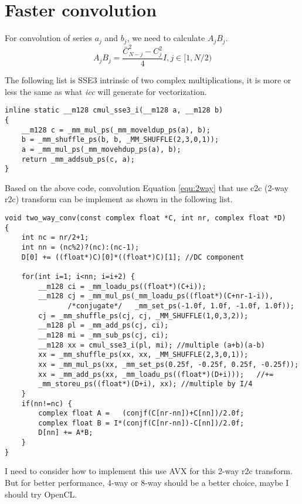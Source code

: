 \documentclass[a4paper,12pt]{article}
\begin{document}
\section{Faster convolution}
For convolution of series $a_j$ and $b_j$, we need to calculate $A_jB_j$.
\begin{equation}
    A_jB_j=\frac{\bar{C}^2_{N-j}-C^2_j}{4}I , j\in[1, N/2) 
        \label{equ:2way}
\end{equation}
\par
The following list is SSE3 intrinsic of two complex multiplications, 
it is more or less the same as what \emph{icc} will generate for vectorization.
\begin{lstlisting}
inline static __m128 cmul_sse3_i(__m128 a, __m128 b)
{
    __m128 c = _mm_mul_ps(_mm_moveldup_ps(a), b);
    b = _mm_shuffle_ps(b, b, _MM_SHUFFLE(2,3,0,1));
    a = _mm_mul_ps(_mm_movehdup_ps(a), b);
    return _mm_addsub_ps(c, a);
}
\end{lstlisting}
Based on the above code, convolution Equation \ref{equ:2way} that use c2c (2-way r2c) transform 
can be implement as shown in the following list.
\begin{lstlisting}
void two_way_conv(const complex float *C, int nr, complex float *D)
{
    int nc = nr/2+1;
    int nn = (nc%2)?(nc):(nc-1);
    D[0] += ((float*)C)[0]*((float*)C)[1]; //DC component

    for(int i=1; i<nn; i=i+2) {
        __m128 ci = _mm_loadu_ps((float*)(C+i));
        __m128 cj = _mm_mul_ps(_mm_loadu_ps((float*)(C+nr-1-i)), 
               /*conjugate*/   _mm_set_ps(-1.0f, 1.0f, -1.0f, 1.0f)); 
        cj = _mm_shuffle_ps(cj, cj, _MM_SHUFFLE(1,0,3,2));
        __m128 pl = _mm_add_ps(cj, ci);
        __m128 mi = _mm_sub_ps(cj, ci);
        __m128 xx = cmul_sse3_i(pl, mi); //multiple (a+b)(a-b)
        xx = _mm_shuffle_ps(xx, xx, _MM_SHUFFLE(2,3,0,1));
        xx = _mm_mul_ps(xx, _mm_set_ps(0.25f, -0.25f, 0.25f, -0.25f));
        xx = _mm_add_ps(xx, _mm_loadu_ps((float*)(D+i)));   //+=
        _mm_storeu_ps((float*)(D+i), xx); //multiple by I/4
    }
    if(nn!=nc) {
        complex float A =   (conjf(C[nr-nn])+C[nn])/2.0f;
        complex float B = I*(conjf(C[nr-nn])-C[nn])/2.0f;
        D[nn] += A*B;
    }
}
\end{lstlisting}
\par
I need to consider how to implement this use AVX for this 2-way r2c transform.
But for better performance, 4-way or 8-way should be a better choice, 
maybe I should try OpenCL.
\end{document}
